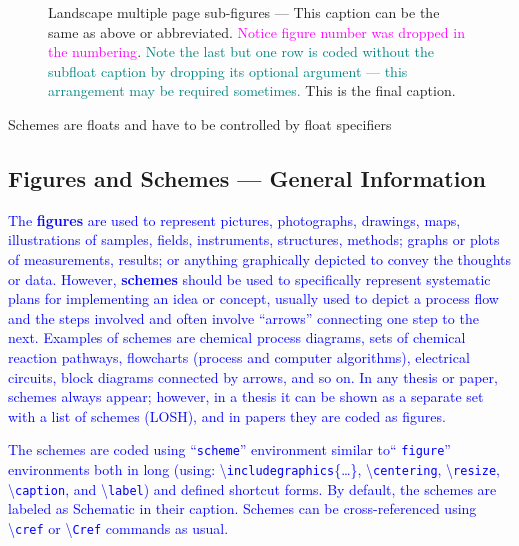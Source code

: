 \documentclass[phd]{ndsu-thesis-2022}
\newcommand\italk[1]{\textcolor{blue}{#1}}  %
\newcommand\cmd[1]{\textbackslash\texttt{#1}}  %
\begin{document}
\begin{landscape}
\begin{figure}[t]
\captionsetup{singlelinecheck=false} %
\caption[]{Landscape multiple page sub-figures --- This caption can be the same as above or abbreviated.  \textcolor{magenta}{Notice figure number was dropped in the numbering}. \textcolor{teal}{Note the last but one row is coded without the subfloat caption by dropping its optional argument --- this arrangement may be required sometimes.} This is the final caption.} 
\end{figure}

\end{landscape}

{Schemes are floats and have to be controlled by float specifiers}

\subsection{Figures and Schemes --- General Information}\label{figs}

\italk{The \textbf{figures} are used to represent pictures, photographs, drawings, maps, illustrations of samples, fields, instruments, structures, methods; graphs or plots of measurements, results; or anything graphically depicted to convey the thoughts or data. However, \textbf{schemes} should be used to specifically represent systematic plans for implementing an idea or concept, usually used to depict a process flow and the steps involved and often involve ``arrows'' connecting one step to the next. Examples of schemes are chemical process diagrams, sets of chemical reaction pathways, flowcharts (process and computer algorithms), electrical circuits, block diagrams connected by arrows, and so on. In any thesis or paper, schemes always appear; however, in a thesis it can be shown as a separate set with a list of schemes (LOSH), and in papers they are coded as figures.}

\italk{The schemes are coded using ``\texttt{scheme}'' environment similar to`` \texttt{figure}'' environments both in long (using: \cmd{includegraphics}\{\ldots\}, \cmd{centering}, \cmd{resize}, \cmd{caption}, and \cmd{label}) and defined shortcut forms.  By default, the schemes are labeled as Schematic in their caption. Schemes can be cross-referenced using \cmd{cref} or \cmd{Cref} commands as usual.} 
\end{document}
